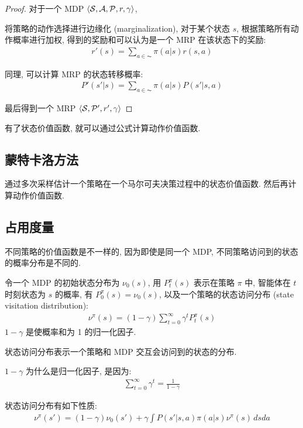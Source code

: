 \begin{proof}
    对于一个 MDP $\braket{\mathcal{S}, \mathcal{A}, \mathcal{P}, r,\gamma}$,

    将策略的动作选择进行边缘化 (marginalization), 对于某个状态 $s$, 根据策略所有动作概率进行加权, 得到的奖励和可以认为是一个 MRP 在该状态下的奖励:
    \begin{align*}
        r'(s) = \sum_{a\in\AC}\pi(a|s)r(s,a)
    \end{align*}

    同理, 可以计算 MRP 的状态转移概率:
    \begin{align*}
        P'(s'|s) = \sum_{a\in\AC}\pi(a|s)P(s'|s,a)
    \end{align*}

    最后得到一个 MRP $\braket{\mathcal{S}, \mathcal{P}', r',\gamma}$
\end{proof}

有了状态价值函数, 就可以通过公式计算动作价值函数. 

\subsection{蒙特卡洛方法}
通过多次采样估计一个策略在一个马尔可夫决策过程中的状态价值函数. 然后再计算动作价值函数.


\subsection{占用度量}
不同策略的价值函数是不一样的, 因为即使是同一个 MDP, 不同策略访问到的状态的概率分布是不同的. 

\begin{definition}[状态访问分布]
    令一个 MDP 的初始状态分布为 $\nu_0(s)$, 用 $P_t^\pi(s)$ 表示在策略 $\pi$ 中, 智能体在 $t$ 时刻状态为 $s$ 的概率, 有 $P_0^\pi(s)=\nu_0(s)$, 以及一个策略的状态访问分布 (state visitation distribution):
    \begin{align*}
        \nu^\pi(s) = (1-\gamma)\sum_{t=0}^\infty \gamma^t P_t^\pi(s)
    \end{align*}
    $1-\gamma$ 是使概率和为 1 的归一化因子. 
    
    状态访问分布表示一个策略和 MDP 交互会访问到的状态的分布.
\end{definition}

$1-\gamma$ 为什么是归一化因子, 是因为: 
\begin{align*}
    \sum_{t=0}^\infty \gamma^t = \frac{1}{1-\gamma}
\end{align*}

状态访问分布有如下性质:
\begin{align*}
    \nu^\pi(s')=(1-\gamma)\nu_0(s') + \gamma \int P(s'|s, a)\pi(a|s)\nu^\pi(s) \,dsda 
\end{align*}


